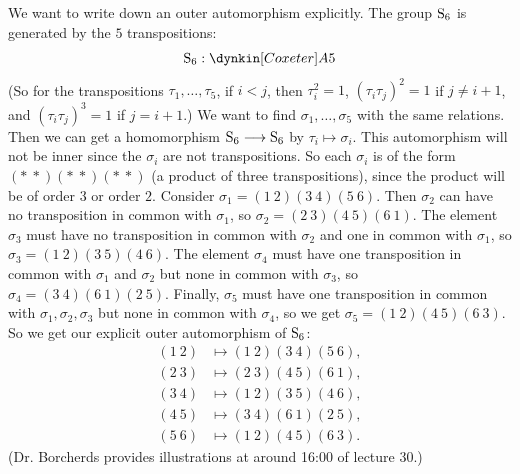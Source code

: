 \documentclass[11pt, oneside]{amsart}
\begin{document}
We want to write down an outer automorphism explicitly. The group $\operatorname{S}_6$ is generated by the $5$ transpositions:
$$
\Sg_6 : \dynkin [Coxeter]A{5}
$$
(So for the transpositions $\tau_1,\hdots, \tau_5$, if $i < j$, then $\tau_i^2 = 1$, $(\tau_i\tau_j)^2=1$ if $j \ne i+1$, and $(\tau_i\tau_j)^3=1$ if $j = i+1$.) We want to find $\sigma_1 ,\hdots,\sigma_5$ with the same relations. Then we can get a homomorphism $\operatorname{S}_6\longrightarrow\operatorname{S}_6$ by $\tau_i \mapsto \sigma_i$. This automorphism will not be inner since the $\sigma_i$ are not transpositions. So each $\sigma_i$ is of the form $(*\ *)(*\ *)(*\ *)$ (a product of three transpositions), since the product will be of order $3$ or order $2$. Consider $\sigma_1 = (1\ 2)(3\ 4)(5\ 6)$. Then $\sigma_2$ can have no transposition in common with $\sigma_1$, so $\sigma_2 = (2\ 3)(4\ 5)(6\ 1)$. The element $\sigma_3$ must have no transposition in common with $\sigma_2$ and one in common with $\sigma_1$, so $\sigma_3 = (1\ 2)(3\ 5)(4\ 6)$. The element $\sigma_4$ must have one transposition in common with $\sigma_1$ and $\sigma_2$ but none in common with $\sigma_3$, so $\sigma_4 = (3\ 4)(6\ 1)(2\ 5)$. Finally, $\sigma_5$ must have one transposition in common with $\sigma_1,\sigma_2,\sigma_3$ but none in common with $\sigma_4$, so we get $\sigma_5 = (1\ 2)(4\ 5)(6\ 3)$. So we get our explicit outer automorphism of $\operatorname{S}_6$:
\begin{align*}
(1\ 2) &\mapsto (1\ 2)(3\ 4)(5\ 6),\\
(2\ 3) &\mapsto (2\ 3)(4\ 5)(6\ 1),\\
(3\ 4) &\mapsto (1\ 2)(3\ 5)(4\ 6),\\
(4\ 5) &\mapsto (3\ 4)(6\ 1)(2\ 5),\\
(5\ 6) &\mapsto (1\ 2)(4\ 5)(6\ 3).
\end{align*}
(Dr. Borcherds provides illustrations at around 16:00 of lecture 30.) 
\end{document}

